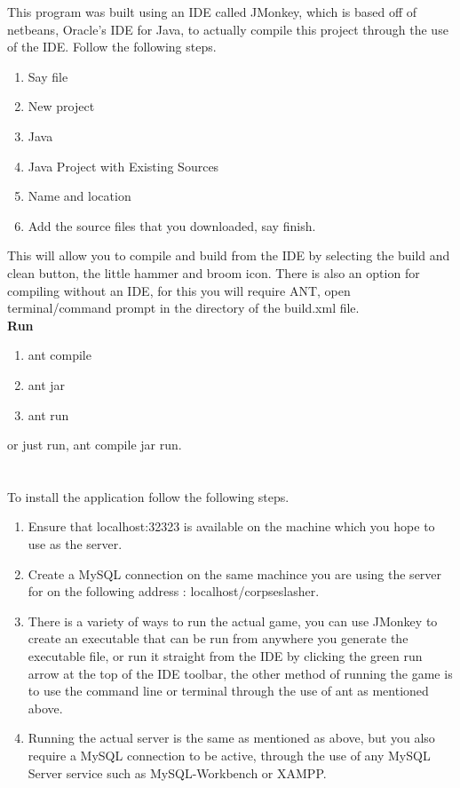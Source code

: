 \documentclass[letterpaper]{article}
\begin{document}
		This program was built using an IDE called JMonkey, which is based off of netbeans, Oracle's IDE for Java, to actually compile this project through the use of the IDE. Follow the following steps.
		\begin{enumerate}
		
		\item Say file 
		\item New project
		\item Java 
		\item Java Project with Existing Sources 
		\item Name and location
		\item Add the source files that you downloaded, say finish.
		
		\end{enumerate} 
		This will allow you to compile and build from the IDE by selecting the build and clean button, the little hammer and broom icon. There is also an option for compiling without an IDE, for this you will require ANT, open terminal/command prompt in the directory of the build.xml file.\\ \textbf{Run}
	\begin{enumerate}
	\item ant compile
	\item ant jar
	\item ant run
\end{enumerate}	 
or just run, ant compile jar run.
		
		\section*{\colorbox{black}{}} 
	\vspace{0.1in}
	
	To install the application follow the following steps.
	\begin{enumerate}
		\item Ensure that localhost:32323 is available on the machine which you hope to use as the server.
		\item Create a MySQL connection on the same machince you are using the server for on the following address : localhost/corpseslasher.
		\item There is a variety of ways to run the actual game, you can use JMonkey to create an executable that can be run from anywhere you generate the executable file, or run it straight from the IDE by clicking the green run arrow at the top of the IDE toolbar, the other method of running the game is to use the command line or terminal through the use of ant as mentioned above.
		\item Running the actual server is the same as mentioned as above, but you also require a MySQL connection to be active, through the use of any MySQL Server service such as MySQL-Workbench or XAMPP.
	\end{enumerate}
	\newpage
\end{document}
